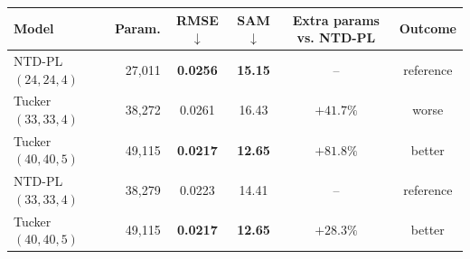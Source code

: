 \begin{tabular}{@{}l r c c c c@{}}
\toprule
Model & Param. & RMSE$\downarrow$ & SAM$\downarrow$ & Extra params vs. NTD-PL & Outcome \\
\midrule
NTD-PL $(24,24,4)$ & 27,011 & \textbf{0.0256} & \textbf{15.15} & -- & reference \\
Tucker $(33,33,4)$ & 38,272 & 0.0261 & 16.43 & $+41.7\%$ & worse \\
Tucker $(40,40,5)$ & 49,115 & \textbf{0.0217} & \textbf{12.65} & $+81.8\%$ & better \\
\midrule
NTD-PL $(33,33,4)$ & 38,279 & 0.0223 & 14.41 & -- & reference \\
Tucker $(40,40,5)$ & 49,115 & \textbf{0.0217} & \textbf{12.65} & $+28.3\%$ & better \\
\bottomrule
\end{tabular}
